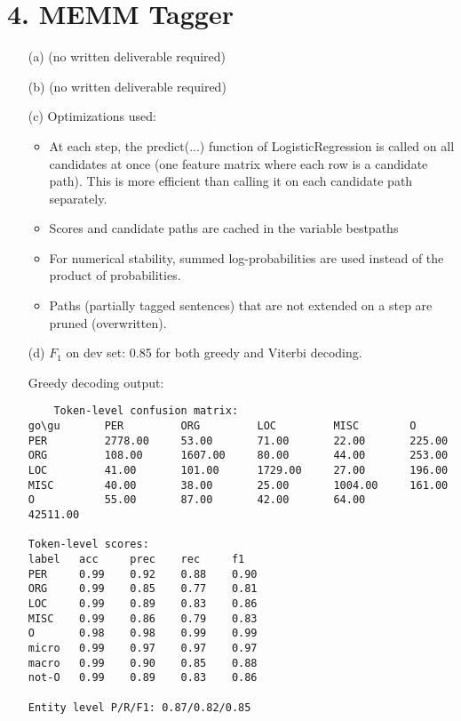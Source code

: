 \documentclass{article}
\begin{document}
\section*{4. MEMM Tagger}

\begin{itemize}
    \item[(a)] (no written deliverable required)
    \item[(b)] (no written deliverable required)
    \item[(c)] Optimizations used:
    \begin{itemize}

    \item At each step, the predict(...) function of LogisticRegression is called on all candidates at once (one feature matrix where each row is a candidate path). This is more efficient than calling it on each candidate path separately.
    \item Scores and candidate paths are cached in the variable best\textunderscore paths
    \item For numerical stability, summed log-probabilities are used instead of the product of probabilities.
    \item Paths (partially tagged sentences) that are not extended on a step are pruned (overwritten).
    \end{itemize}

    \item[(d)] $F_1$ on dev set: 0.85 for both greedy and Viterbi decoding.
    
Greedy decoding output:

\begin{verbatim}
    Token-level confusion matrix:
go\gu   	PER     	ORG     	LOC     	MISC    	O       
PER     	2778.00 	53.00   	71.00   	22.00   	225.00  
ORG     	108.00  	1607.00 	80.00   	44.00   	253.00  
LOC     	41.00   	101.00  	1729.00 	27.00   	196.00  
MISC    	40.00   	38.00   	25.00   	1004.00 	161.00  
O       	55.00   	87.00   	42.00   	64.00   	42511.00

Token-level scores:
label	acc  	prec 	rec  	f1   
PER  	0.99 	0.92 	0.88 	0.90 
ORG  	0.99 	0.85 	0.77 	0.81 
LOC  	0.99 	0.89 	0.83 	0.86 
MISC 	0.99 	0.86 	0.79 	0.83 
O    	0.98 	0.98 	0.99 	0.99 
micro	0.99 	0.97 	0.97 	0.97 
macro	0.99 	0.90 	0.85 	0.88 
not-O	0.99 	0.89 	0.83 	0.86 

Entity level P/R/F1: 0.87/0.82/0.85

\end{verbatim}


\end{itemize}
\end{document}
